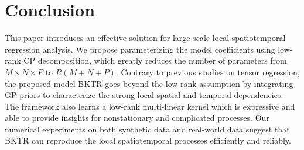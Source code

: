 \documentclass[12pt]{article}
\begin{document}









\section{Conclusion}
\label{sec: conclu}

This paper introduces an effective solution for large-scale local spatiotemporal regression analysis. We propose parameterizing the model coefficients using low-rank CP decomposition, which greatly reduces the number of parameters from $M\times N\times P$ to $R(M+N+P)$. Contrary to previous studies on tensor regression, the proposed model BKTR goes beyond the low-rank assumption by integrating GP priors to characterize the strong local spatial and temporal dependencies. The framework also learns a low-rank multi-linear kernel which is expressive and able to provide insights for nonstationary and complicated processes. Our numerical experiments on both synthetic data and real-world data suggest that BKTR can reproduce the local spatiotemporal processes efficiently and reliably. 


\end{document}

